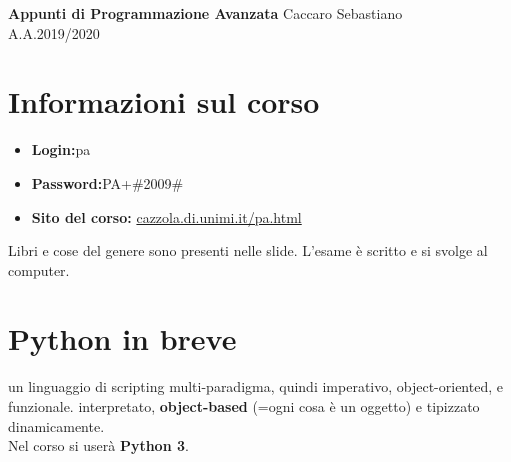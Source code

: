 \documentclass[a4paper,12pt]{article}
\begin{document}
\begin{titlepage}
\begin{center}
	\Large{\textbf{Appunti di Programmazione Avanzata}}
\vfill
\normalsize{Caccaro Sebastiano}\\
\normalsize{A.A.2019/2020}
\end{center}
\end{titlepage}

\tableofcontents


\clearpage


\section{Informazioni sul corso}
\begin{itemize}
	\item\textbf{Login:}pa\\
	\item\textbf{Password:}PA+\#2009\#\\
	\item\textbf{Sito del corso:} \url{cazzola.di.unimi.it/pa.html}\\
\end{itemize}
Libri e cose del genere sono presenti nelle slide. L'esame è scritto e si svolge al computer.

\section{Python in breve}
\E un linguaggio di scripting multi-paradigma, quindi imperativo, object-oriented, e funzionale. \E interpretato, \textbf{object-based} (=ogni cosa è un oggetto) e tipizzato dinamicamente.\\
Nel corso si userà \textbf{Python 3}.
\end{document}

